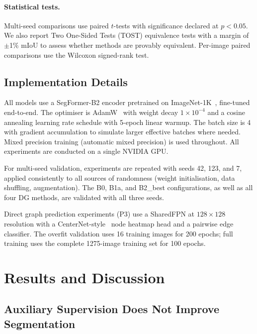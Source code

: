 \documentclass[preprint,12pt]{elsarticle}
\begin{document}
\paragraph{Statistical tests.}
Multi-seed comparisons use paired $t$-tests with significance declared at $p < 0.05$. We also report Two One-Sided Tests (TOST) equivalence tests with a margin of $\pm$1\% mIoU to assess whether methods are provably equivalent. Per-image paired comparisons use the Wilcoxon signed-rank test.

\subsection{Implementation Details}
\label{sec:implementation}

All models use a SegFormer-B2 encoder pretrained on ImageNet-1K~\cite{deng2009imagenet}, fine-tuned end-to-end. The optimiser is AdamW~\cite{loshchilov2019adamw} with weight decay $1 \times 10^{-4}$ and a cosine annealing learning rate schedule with 5-epoch linear warmup. The batch size is 4 with gradient accumulation to simulate larger effective batches where needed. Mixed precision training (automatic mixed precision) is used throughout. All experiments are conducted on a single NVIDIA GPU.

For multi-seed validation, experiments are repeated with seeds 42, 123, and 7, applied consistently to all sources of randomness (weight initialisation, data shuffling, augmentation). The B0, B1a, and B2\_best configurations, as well as all four DG methods, are validated with all three seeds.

Direct graph prediction experiments (P3) use a SharedFPN at $128 \times 128$ resolution with a CenterNet-style~\cite{zhou2019centernet} node heatmap head and a pairwise edge classifier. The overfit validation uses 16 training images for 200 epochs; full training uses the complete 1275-image training set for 100 epochs.



\section{Results and Discussion}
\label{sec:results}

\subsection{Auxiliary Supervision Does Not Improve Segmentation}
\label{sec:results_aux}
\end{document}
